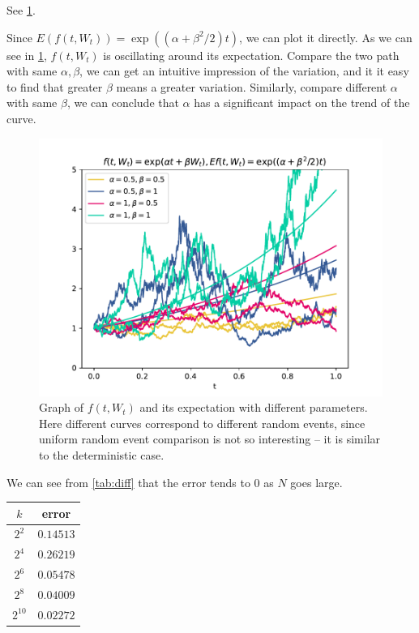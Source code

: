 \problem
\begin{subproblem}[(\arabic*)]
    \item See \cref{fig:GBM}.
    \item Since $E(f(t,W_t))=\exp((\alpha+\beta^2/2)t)$, we can
    plot it directly. As we can see in \cref{fig:GBM},
    $f(t,W_t)$ is oscillating around its expectation.
    Compare the two path with same $\alpha,\beta$, we can
    get an intuitive impression of the variation, and it
    it easy to find that
    greater $\beta$ means a greater variation.
    Similarly, compare different $\alpha$ with same $\beta$,
    we can conclude that $\alpha$ has a significant impact on 
    the trend of the curve.

    \begin{figure}[h]
        \centering
        \includegraphics[width=\textwidth]{GBM}
        \caption{Graph of $f(t,W_t)$ and its expectation with different
        parameters. Here different curves correspond to different random events,
        since uniform random event comparison is not so interesting -- it
        is similar to the deterministic case.}
        \label{fig:GBM}
    \end{figure}
\end{subproblem}

\problem
We can see from \cref{tab:diff} that the error tends to 0 as $N$ goes large.

\begin{margintable}
    \centering
    \begin{tabular}{cc}
        \toprule
        $k$ & error \\
        \midrule
        $2^{2}$ & $0.14513$\\
        $2^{4}$ & $0.26219$\\
        $2^{6}$ & $0.05478$\\
        $2^{8}$ & $0.04009$\\
        $2^{10}$ & $0.02272$\\
        \bottomrule
    \end{tabular}
    \caption{Difference Between It\^o and Stratonovich Integral}
    \label{tab:diff}
\end{margintable}

